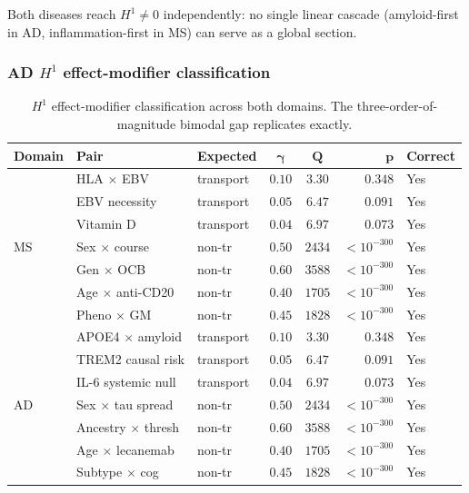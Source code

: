\documentclass[11pt]{article}
\begin{document}
Both diseases reach $H^1 \neq 0$ independently: no single linear cascade (amyloid-first in AD, inflammation-first in MS) can serve as a global section.

\subsubsection{AD $H^1$ effect-modifier classification}

\begin{table}[t]
\centering
\caption{$H^1$ effect-modifier classification across both domains. The three-order-of-magnitude bimodal gap replicates exactly.}
\label{tab:h1-cross}
\small
\begin{tabular}{@{}lllccrl@{}}
\toprule
\textbf{Domain} & \textbf{Pair} & \textbf{Expected} & $\boldsymbol{\gamma}$ & $\boldsymbol{Q}$ & $\boldsymbol{p}$ & \textbf{Correct} \\
\midrule
\multirow{7}{*}{MS}
& HLA $\times$ EBV & transport & $0.10$ & $3.30$ & $0.348$ & Yes \\
& EBV necessity & transport & $0.05$ & $6.47$ & $0.091$ & Yes \\
& Vitamin D & transport & $0.04$ & $6.97$ & $0.073$ & Yes \\
& Sex $\times$ course & non-tr & $0.50$ & $2434$ & $< 10^{-300}$ & Yes \\
& Gen $\times$ OCB & non-tr & $0.60$ & $3588$ & $< 10^{-300}$ & Yes \\
& Age $\times$ anti-CD20 & non-tr & $0.40$ & $1705$ & $< 10^{-300}$ & Yes \\
& Pheno $\times$ GM & non-tr & $0.45$ & $1828$ & $< 10^{-300}$ & Yes \\
\midrule
\multirow{7}{*}{AD}
& APOE4 $\times$ amyloid & transport & $0.10$ & $3.30$ & $0.348$ & Yes \\
& TREM2 causal risk & transport & $0.05$ & $6.47$ & $0.091$ & Yes \\
& IL-6 systemic null & transport & $0.04$ & $6.97$ & $0.073$ & Yes \\
& Sex $\times$ tau spread & non-tr & $0.50$ & $2434$ & $< 10^{-300}$ & Yes \\
& Ancestry $\times$ thresh & non-tr & $0.60$ & $3588$ & $< 10^{-300}$ & Yes \\
& Age $\times$ lecanemab & non-tr & $0.40$ & $1705$ & $< 10^{-300}$ & Yes \\
& Subtype $\times$ cog & non-tr & $0.45$ & $1828$ & $< 10^{-300}$ & Yes \\
\bottomrule
\end{tabular}
\end{table}
\end{document}
